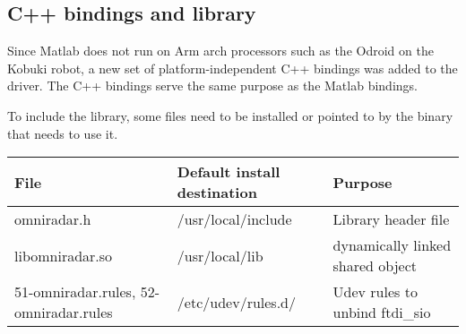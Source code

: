 \subsection{C++ bindings and library}\label{c-bindings-and-library}

Since Matlab does not run on Arm arch processors such as the Odroid on
the Kobuki robot, a new set of platform-independent C++ bindings was
added to the driver. The C++ bindings serve the same purpose as the
Matlab bindings.

To include the library, some files need to be installed or pointed to by
the binary that needs to use it.

\begin{longtable}[]{@{}lll@{}}
\toprule
\begin{minipage}[b]{0.06\columnwidth}\raggedright\strut
File\strut
\end{minipage} & \begin{minipage}[b]{0.15\columnwidth}\raggedright\strut
Default install destination\strut
\end{minipage} & \begin{minipage}[b]{0.10\columnwidth}\raggedright\strut
Purpose\strut
\end{minipage}\tabularnewline
\midrule
\endhead
\begin{minipage}[t]{0.06\columnwidth}\raggedright\strut
omniradar.h\strut
\end{minipage} & \begin{minipage}[t]{0.15\columnwidth}\raggedright\strut
/usr/local/include\strut
\end{minipage} & \begin{minipage}[t]{0.10\columnwidth}\raggedright\strut
Library header file\strut
\end{minipage}\tabularnewline
\begin{minipage}[t]{0.06\columnwidth}\raggedright\strut
libomniradar.so\strut
\end{minipage} & \begin{minipage}[t]{0.15\columnwidth}\raggedright\strut
/usr/local/lib\strut
\end{minipage} & \begin{minipage}[t]{0.10\columnwidth}\raggedright\strut
dynamically linked shared object\strut
\end{minipage}\tabularnewline
\begin{minipage}[t]{0.06\columnwidth}\raggedright\strut
51-omniradar.rules, 52-omniradar.rules\strut
\end{minipage} & \begin{minipage}[t]{0.15\columnwidth}\raggedright\strut
/etc/udev/rules.d/\strut
\end{minipage} & \begin{minipage}[t]{0.10\columnwidth}\raggedright\strut
Udev rules to unbind ftdi\_sio\strut
\end{minipage}\tabularnewline
\bottomrule
\end{longtable}

